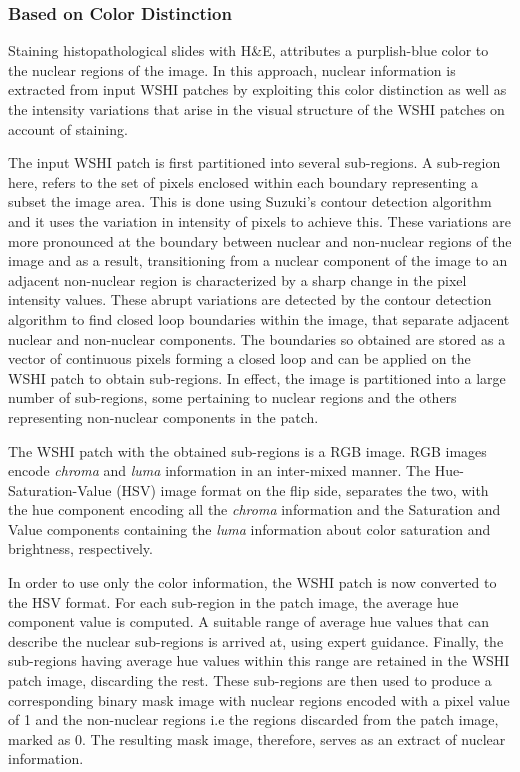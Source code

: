 \documentclass{comjnl}
\begin{document}
\subsubsection{Based on Color Distinction}

Staining histopathological slides with H&E, attributes a purplish-blue color to the nuclear regions of the image. In this approach, nuclear information is extracted from input WSHI patches by exploiting this color distinction as well as the intensity variations that arise in the visual structure of the WSHI patches on account of staining.

The input WSHI patch is first partitioned into several sub-regions. A sub-region here, refers to the set of pixels enclosed within each boundary representing a subset the image area. This is done using Suzuki's contour detection algorithm \cite{suzuki} and it uses the variation in intensity of pixels to achieve this. These variations are more pronounced at the boundary between nuclear and non-nuclear regions of the image and as a result, transitioning from a nuclear component of the image to an adjacent non-nuclear region is characterized by a sharp change in the pixel intensity values. These abrupt variations are detected by the contour detection algorithm to find closed loop boundaries within the image, that separate adjacent nuclear and non-nuclear components. The boundaries so obtained are stored as a vector of continuous pixels forming a closed loop and can be applied on the WSHI patch to obtain sub-regions. In effect, the image is partitioned into a large number of sub-regions, some pertaining to nuclear regions and the others representing non-nuclear components in the patch. 

The WSHI patch with the obtained sub-regions is a RGB image. RGB images encode \emph{chroma} and \emph{luma} information in an inter-mixed manner. The Hue-Saturation-Value (HSV) image format on the flip side, separates the two, with the hue component encoding all the \emph{chroma} information and the Saturation and Value components containing the \emph{luma} information about color saturation and brightness, respectively. 

In order to use only the color information, the WSHI patch is now converted to the HSV format. For each sub-region in the patch image, the average hue component value is computed. A suitable range of average hue values that can describe the nuclear sub-regions is arrived at, using expert guidance. Finally, the sub-regions having average hue values within this range are retained in the WSHI patch image, discarding the rest. These sub-regions are then used to produce a corresponding binary mask image with nuclear regions encoded with a pixel value of 1 and the non-nuclear regions i.e the regions discarded from the patch image, marked as 0. The resulting mask image, therefore, serves as an extract of nuclear information.
\end{document}
